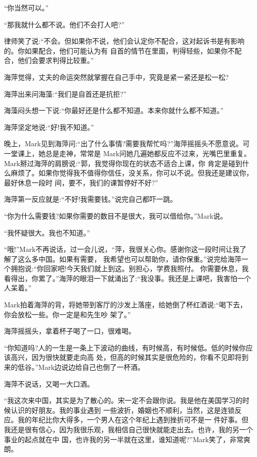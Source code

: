 \documentclass[11pt,a4paper,onecolumn]{article}
\begin{document}
``你当然可以。''

``那我就什么都不说。他们不会打人吧?''

律师笑了说:``不会。但如果你不说，他们会认定你不配合，这对起诉书是有影响的。你如果配合，他们可能认为有
自首的情节在里面，判得轻些，如果你不配合，他们会要求判得比较重。''

海萍觉得，丈夫的命运突然就掌握在自己手中，究竟是紧一紧还是松一松?

海萍出来问海藻:``我们是自首还是抗拒?''

海藻闷头想一下说:``你最好还是什么都不知道。本来你就什么都不知道。''

海萍坚定地说:``好!我不知道。''

晚上，Mark见到海萍问:``出了什么事情?需要我帮忙吗?''海萍摇摇头不愿意说。可一堂课上，她总是走神，常常是
Mark问她几遍她都反应不过来，光嘴巴里重复。Mark掰过海萍的肩膀说:``郭，我觉得你现在的状态不适合上课，你
肯定是碰到什么麻烦了。如果你觉得我不值得你信任，没关系，你可以不说。但我还是建议你，最好休息一段时
间，要不，我们的课暂停好不好?''

海萍第一反应就是:``不好!我需要钱。''说完自己都吓一跳。

``你为什么需要钱?如果你需要的数目不是很大，我可以借给你。''Mark说。

``我怀疑很大。我也不知道。''

``哦!''Mark不再说话，过一会儿说，``萍，我很关心你。感谢你这一段时间让我了解了这么多中国。如果有需要，
我希望也可以帮助你，请你保重。''说完给海萍一个拥抱说:``你回家吧!今天我们就上到这。别担心，学费我照付。
你需要休息，我看得出，你累了。''海萍的眼泪一下就涌出了:``我没事。我还是上课吧，我害怕一个人呆着。''

Mark拍着海萍的背，将她带到客厅的沙发上落座，给她倒了杯红酒说:``喝下去，你会放松一些。你一定是和先生吵
架了。''

海萍摇摇头，拿着杯子喝了一口，很难喝。

``你知道吗?人的一生是一条上下波动的曲线，有时候高，有时候低。低的时候你应该高兴，因为很快就要走向高
处，但高的时候其实是很危险的，你看不见即将到来的低谷。''Mark边说边给自己也倒了一杯酒。

海萍不说话，又喝一大口酒。

``我这次来中国，其实是为了散心的。宋一定不会跟你说。我是他在美国学习的时候认识的好朋友。我的事业遇到
一些波折，婚姻也不顺利，当然，这是连锁反应。我的年纪比你大得多，一个男人在这个年纪上遇到挫折可不是一
件好事。但我还是很有信心，因为我很乐观，我相信自己很快就能走出去。也许，我的另一个事业的起点就在中
国，也许我的另一半就在这里，谁知道呢?''Mark笑了，非常爽朗。
\end{document}
